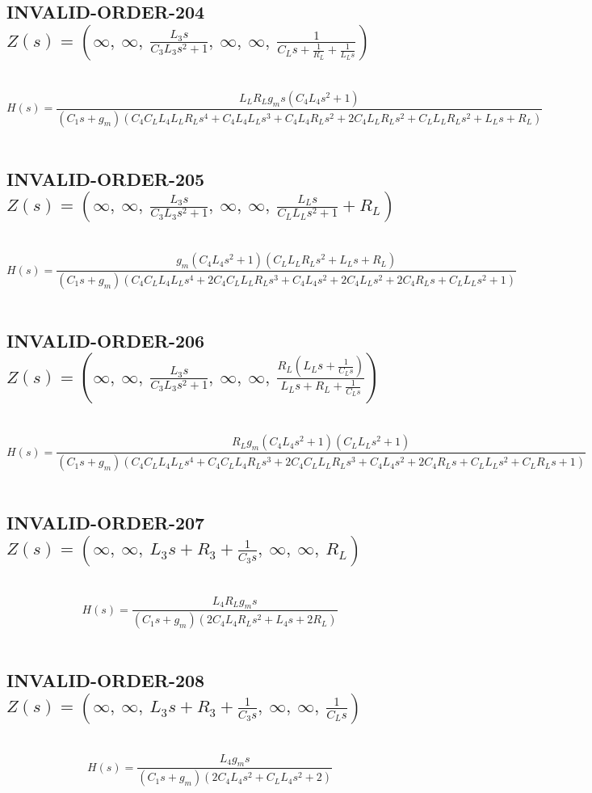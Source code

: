 \documentclass{article}
\begin{document}
\subsection{INVALID-ORDER-204 $Z(s) = \left( \infty, \  \infty, \  \frac{L_{3} s}{C_{3} L_{3} s^{2} + 1}, \  \infty, \  \infty, \  \frac{1}{C_{L} s + \frac{1}{R_{L}} + \frac{1}{L_{L} s}}\right)$ } \ 
\textbf{\[H(s) = \frac{L_{L} R_{L} g_{m} s \left(C_{4} L_{4} s^{2} + 1\right)}{\left(C_{1} s + g_{m}\right) \left(C_{4} C_{L} L_{4} L_{L} R_{L} s^{4} + C_{4} L_{4} L_{L} s^{3} + C_{4} L_{4} R_{L} s^{2} + 2 C_{4} L_{L} R_{L} s^{2} + C_{L} L_{L} R_{L} s^{2} + L_{L} s + R_{L}\right)}\] } \ 
\subsection{INVALID-ORDER-205 $Z(s) = \left( \infty, \  \infty, \  \frac{L_{3} s}{C_{3} L_{3} s^{2} + 1}, \  \infty, \  \infty, \  \frac{L_{L} s}{C_{L} L_{L} s^{2} + 1} + R_{L}\right)$ } \ 
\textbf{\[H(s) = \frac{g_{m} \left(C_{4} L_{4} s^{2} + 1\right) \left(C_{L} L_{L} R_{L} s^{2} + L_{L} s + R_{L}\right)}{\left(C_{1} s + g_{m}\right) \left(C_{4} C_{L} L_{4} L_{L} s^{4} + 2 C_{4} C_{L} L_{L} R_{L} s^{3} + C_{4} L_{4} s^{2} + 2 C_{4} L_{L} s^{2} + 2 C_{4} R_{L} s + C_{L} L_{L} s^{2} + 1\right)}\] } \ 
\subsection{INVALID-ORDER-206 $Z(s) = \left( \infty, \  \infty, \  \frac{L_{3} s}{C_{3} L_{3} s^{2} + 1}, \  \infty, \  \infty, \  \frac{R_{L} \left(L_{L} s + \frac{1}{C_{L} s}\right)}{L_{L} s + R_{L} + \frac{1}{C_{L} s}}\right)$ } \ 
\textbf{\[H(s) = \frac{R_{L} g_{m} \left(C_{4} L_{4} s^{2} + 1\right) \left(C_{L} L_{L} s^{2} + 1\right)}{\left(C_{1} s + g_{m}\right) \left(C_{4} C_{L} L_{4} L_{L} s^{4} + C_{4} C_{L} L_{4} R_{L} s^{3} + 2 C_{4} C_{L} L_{L} R_{L} s^{3} + C_{4} L_{4} s^{2} + 2 C_{4} R_{L} s + C_{L} L_{L} s^{2} + C_{L} R_{L} s + 1\right)}\] } \ 
\subsection{INVALID-ORDER-207 $Z(s) = \left( \infty, \  \infty, \  L_{3} s + R_{3} + \frac{1}{C_{3} s}, \  \infty, \  \infty, \  R_{L}\right)$ } \ 
\textbf{\[H(s) = \frac{L_{4} R_{L} g_{m} s}{\left(C_{1} s + g_{m}\right) \left(2 C_{4} L_{4} R_{L} s^{2} + L_{4} s + 2 R_{L}\right)}\] } \ 
\subsection{INVALID-ORDER-208 $Z(s) = \left( \infty, \  \infty, \  L_{3} s + R_{3} + \frac{1}{C_{3} s}, \  \infty, \  \infty, \  \frac{1}{C_{L} s}\right)$ } \ 
\textbf{\[H(s) = \frac{L_{4} g_{m} s}{\left(C_{1} s + g_{m}\right) \left(2 C_{4} L_{4} s^{2} + C_{L} L_{4} s^{2} + 2\right)}\] } \ 
\end{document}
